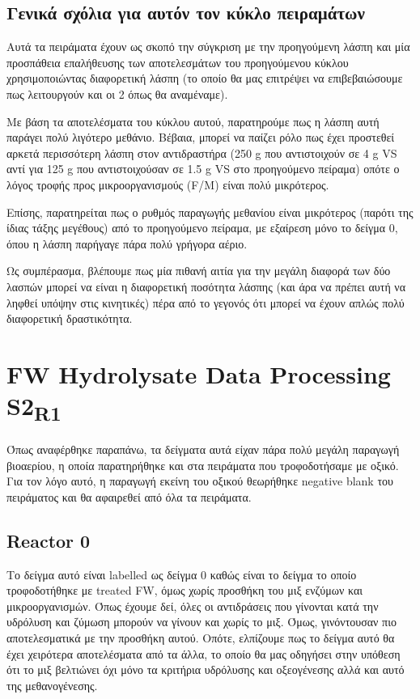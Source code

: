 \documentclass[11pt]{article}
\begin{document}
\subsection{Γενικά σχόλια για αυτόν τον κύκλο πειραμάτων}
\label{sec:org59e5131}
Αυτά τα πειράματα έχουν ως σκοπό την σύγκριση με την προηγούμενη λάσπη και μία προσπάθεια επαλήθευσης των αποτελεσμάτων του προηγούμενου κύκλου χρησιμοποιώντας διαφορετική λάσπη (το οποίο θα μας επιτρέψει να επιβεβαιώσουμε πως λειτουργούν και οι 2 όπως θα αναμέναμε).

Με βάση τα αποτελέσματα του κύκλου αυτού, παρατηρούμε πως η λάσπη αυτή παράγει πολύ λιγότερο μεθάνιο. Βέβαια, μπορεί να παίζει ρόλο πως έχει προστεθεί αρκετά περισσότερη λάσπη στον αντιδραστήρα (250 g που αντιστοιχούν σε 4 g VS αντί για 125 g που αντιστοιχούσαν σε 1.5 g VS στο προηγούμενο πείραμα) οπότε ο λόγος τροφής προς μικροοργανισμούς (F/M) είναι πολύ μικρότερος.

Επίσης, παρατηρείται πως ο ρυθμός παραγωγής μεθανίου είναι μικρότερος (παρότι της ίδιας τάξης μεγέθους) από το προηγούμενο πείραμα, με εξαίρεση μόνο το δείγμα 0, όπου η λάσπη παρήγαγε πάρα πολύ γρήγορα αέριο.

Ως συμπέρασμα, βλέπουμε πως μία πιθανή αιτία για την μεγάλη διαφορά των δύο λασπών μπορεί να είναι η διαφορετική ποσότητα λάσπης (και άρα να πρέπει αυτή να ληφθεί υπόψην στις κινητικές) πέρα από το γεγονός ότι μπορεί να έχουν απλώς πολύ διαφορετική δραστικότητα.

\section{FW Hydrolysate Data Processing S2\textsubscript{R1}}
\label{sec:orgd9e3b28}
Όπως αναφέρθηκε παραπάνω, τα δείγματα αυτά είχαν πάρα πολύ μεγάλη παραγωγή βιοαερίου, η οποία παρατηρήθηκε και στα πειράματα που τροφοδοτήσαμε με οξικό. Για τον λόγο αυτό, η παραγωγή εκείνη του οξικού θεωρήθηκε negative blank του πειράματος και θα αφαιρεθεί από όλα τα πειράματα.

\subsection{Reactor 0}
\label{sec:orgc78a528}
Το δείγμα αυτό είναι labelled ως δείγμα 0 καθώς είναι το δείγμα το οποίο τροφοδοτήθηκε με treated FW, όμως χωρίς προσθήκη του μιξ ενζύμων και μικροοργανισμών. Όπως έχουμε δεί, όλες οι αντιδράσεις που γίνονται κατά την υδρόλυση και ζύμωση μπορούν να γίνουν και χωρίς το μιξ. Όμως, γινόντουσαν πιο αποτελεσματικά με την προσθήκη αυτού. Οπότε, ελπίζουμε πως το δείγμα αυτό θα έχει χειρότερα αποτελέσματα από τα άλλα, το οποίο θα μας οδηγήσει στην υπόθεση ότι το μιξ βελτιώνει όχι μόνο τα κριτήρια υδρόλυσης και οξεογένεσης αλλά και αυτό της μεθανογένεσης.
\end{document}
